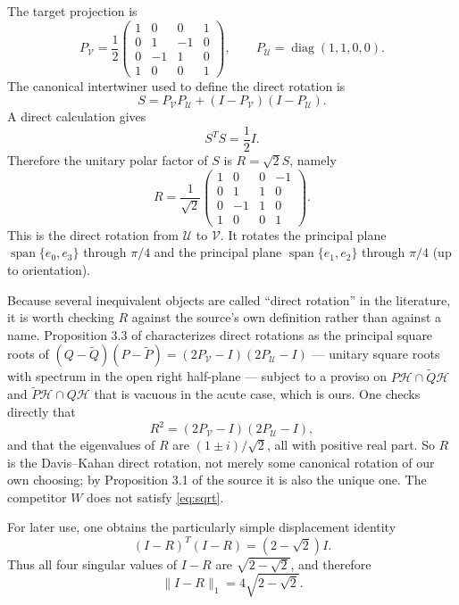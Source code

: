 \documentclass[11pt]{article}
\theoremstyle{definition}
\newcommand{\Hh}{\mathcal H}
\newcommand{\trnorm}[1]{\lVert #1\rVert_1}
\newcommand{\spanof}{\operatorname{span}}
\begin{document}
The target projection is
\[
 P_{\mathcal V}
 =\frac12
 \begin{pmatrix}
 1&0&0&1\\
 0&1&-1&0\\
 0&-1&1&0\\
 1&0&0&1
 \end{pmatrix},
 \qquad
 P_{\mathcal U}=\operatorname{diag}(1,1,0,0).
\]
The canonical intertwiner used to define the direct rotation is
\[
 S=P_{\mathcal V}P_{\mathcal U}
   +(I-P_{\mathcal V})(I-P_{\mathcal U}).
\]
A direct calculation gives
\[
 S^TS=\frac12 I.
\]
Therefore the unitary polar factor of $S$ is $R=\sqrt2S$, namely
\begin{equation}
\label{eq:R}
 R=\frac1{\sqrt2}
 \begin{pmatrix}
  1& 0& 0&-1\\
  0& 1& 1& 0\\
  0&-1& 1& 0\\
  1& 0& 0& 1
 \end{pmatrix}.
\end{equation}
This is the direct rotation from $\mathcal U$ to $\mathcal V$.  It rotates the
principal plane $\spanof\{e_0,e_3\}$ through $\pi/4$ and the principal plane
$\spanof\{e_1,e_2\}$ through $\pi/4$ (up to orientation).

Because several inequivalent objects are called ``direct rotation'' in the
literature, it is worth checking $R$ against the source's own definition rather
than against a name.  Proposition 3.3 of \cite{DavisKahan1970} characterizes
direct rotations as the principal square roots of
$(Q-\tilde Q)(P-\tilde P)=(2P_{\mathcal V}-I)(2P_{\mathcal U}-I)$ --- unitary
square roots with spectrum in the open right half-plane --- subject to a
proviso on $P\Hh\cap\tilde Q\Hh$ and $\tilde P\Hh\cap Q\Hh$ that is vacuous in
the acute case, which is ours.  One checks directly that
\begin{equation}
\label{eq:sqrt}
 R^2=(2P_{\mathcal V}-I)(2P_{\mathcal U}-I),
\end{equation}
and that the eigenvalues of $R$ are $(1\pm i)/\sqrt2$, all with positive real
part.  So $R$ is the Davis--Kahan direct rotation, not merely some canonical
rotation of our own choosing; by Proposition 3.1 of the source it is also the
unique one.  The competitor $W$ does not satisfy \cref{eq:sqrt}.

For later use, one obtains the particularly simple displacement identity
\begin{equation}
\label{eq:Rgram}
 (I-R)^T(I-R)=(2-\sqrt2)I.
\end{equation}
Thus all four singular values of $I-R$ are
$\sqrt{2-\sqrt2}$, and therefore
\begin{equation}
\label{eq:Rtrace}
 \trnorm{I-R}=4\sqrt{2-\sqrt2}.
\end{equation}
\end{document}
